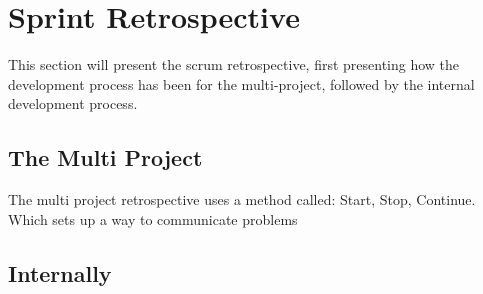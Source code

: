\section{Sprint Retrospective}

This section will present the scrum retrospective, first presenting how the development process has been for the multi-project, followed by the internal development process.

\subsection*{The Multi Project}
The multi project retrospective uses a method called: Start, Stop, Continue.
Which sets up a way to communicate problems 


\subsection{Internally}


